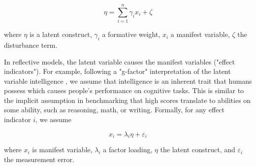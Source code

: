 \begin{equation}\label{eq:formative_model}
    \eta = \sum_{i=1}^{n} \gamma_i x_i + \zeta
\end{equation}

where $\eta$ is a latent construct, $\gamma_i$ a formative weight, $x_i$ a manifest variable, $\zeta$ the disturbance term. 

In reflective models, the latent variable causes the manifest variables ("effect indicators"). For example, following a "g-factor" interpretation of the latent variable intelligence \citep{spearman1961general}, we assume that intelligence is an inherent trait that humans possess which causes people's performance on cognitive tasks. This is similar to the implicit assumption in benchmarking that high scores translate to abilities on some ability, such as reasoning, math, or writing. Formally, for any effect indicator $i$, we assume

\begin{equation}\label{eq:reflective_model}
    x_i = \lambda_i \eta + \varepsilon_i
\end{equation}

where $x_i$ is manifest variable, $\lambda_i$ a factor loading, $\eta$ the latent construct, and $\varepsilon_i$ the measurement error.




